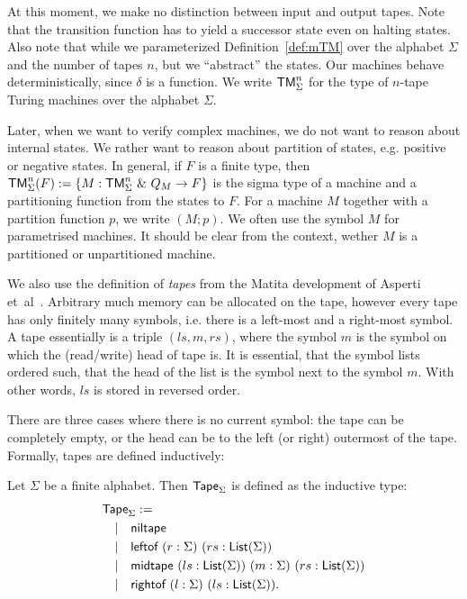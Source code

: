 At this moment, we make no distinction between input and output tapes.  Note that the transition function has to yield a successor state even on
halting states.  Also note that while we parameterized Definition~\ref{def:mTM} over the alphabet $\Sigma$ and the number of tapes $n$, but we
``abstract'' the states.  Our machines behave deterministically, since $\delta$ is a function.  We write $\textsf{TM}_\Sigma^n$ for the type of $n$-tape
Turing machines over the alphabet $\Sigma$.

Later, when we want to verify complex machines, we do not want to reason about internal states.  We rather want to reason about partition of states,
e.g. positive or negative states.  In general, if $F$ is a finite type, then
$\textsf{TM}_\Sigma^n(F) := \left\{ M:\textsf{TM}_\Sigma^n ~\&~ Q_M \rightarrow F \right\}$ is the sigma type of a machine and a partitioning function from the states
to $F$.  For a machine $M$ together with a partition function $p$, we write $(M; p)$.  We often use the symbol $M$ for parametrised machines.  It
should be clear from the context, wether $M$ is a partitioned or unpartitioned machine.

We also use the definition of \emph{tapes} from the Matita development of Asperti et~al~\cite{asperti2015}. Arbitrary much memory can be allocated on
the tape, however every tape has only finitely many symbols, i.e. there is a left-most and a right-most symbol.  A tape essentially is a triple
$(ls,m,rs)$, where the symbol $m$ is the symbol on which the (read/write) head of tape is.  It is essential, that the symbol lists ordered such, that
the head of the list is the symbol next to the symbol $m$.  With other words, $ls$ is stored in reversed order.

There are three cases where there is no current symbol: the tape can be completely empty, or the head can be to the left (or right) outermost of the
tape.  Formally, tapes are defined inductively:

\begin{definition}[Tape]
  \label{def:tape}
  Let $\Sigma$ be a finite alphabet.  Then $\textsf{Tape}_\Sigma$ is defined as the inductive type:
  \begin{align*}
    & \textsf{Tape}_\Sigma := \\
    & \quad | \quad \textsf{niltape} \\
    & \quad | \quad \textsf{leftof}  ~ (r:\Sigma) ~ (rs:\textsf{List}(\Sigma)) \\
    & \quad | \quad \textsf{midtape} ~ (ls:\textsf{List}(\Sigma)) ~ (m:\Sigma) ~ (rs:\textsf{List}(\Sigma)) \\
    & \quad | \quad \textsf{rightof} ~ (l:\Sigma) ~ (ls:\textsf{List}(\Sigma)).
  \end{align*}
\end{definition}

